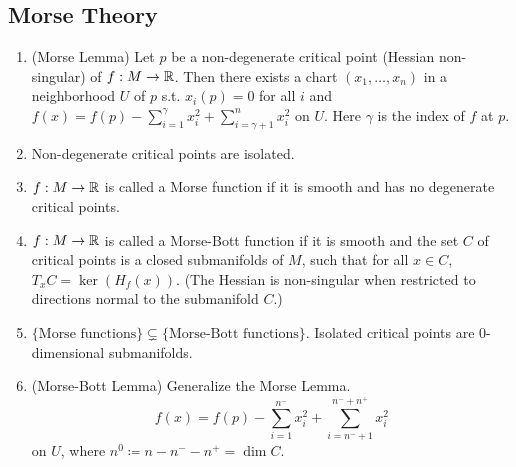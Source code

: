 \subsection{Morse Theory}
\begin{enumerate}
    \item (Morse Lemma) Let $p$ be a non-degenerate critical point (Hessian non-singular) of $f: M \to \mathbb{R}$. Then there exists a chart $(x_1,\dots,x_n)$ in a neighborhood $U$ of $p$ s.t. $x_i(p)=0$ for all $i$ and $f(x)=f(p)-\sum_{i=1}^\gamma x_i^2 + \sum_{i=\gamma+1}^n x_i^2$ on $U$. Here $\gamma$ is the index of $f$ at $p$.
    \item Non-degenerate critical points are isolated.
    \item $f:M\to \mathbb{R}$ is called a Morse function if it is smooth and has no degenerate critical points.
    \item $f: M 
    \to \mathbb{R}$ is called a Morse-Bott function if it is smooth and the set $C$ of critical points is a closed submanifolds of $M$, such that for all $x\in C$, $T_x C = \ker ( H_f(x) )$. (The Hessian is non-singular when restricted to directions normal to the submanifold $C$.) 
    \item $\{ \text{Morse functions} \} \subsetneq \{ \text{Morse-Bott functions} \}$. Isolated critical points are 0-dimensional submanifolds.
    \item (Morse-Bott Lemma) Generalize the Morse Lemma.
    \[
        f(x) = f(p) - \sum_{i=1}^{n^-} x_i^2 + \sum_{i=n^-+1}^{n^-+n^+} x_i^2
    \]
    on $U$, where $n^0 \coloneqq n-n^- - n^+ = \dim C$.
\end{enumerate}
